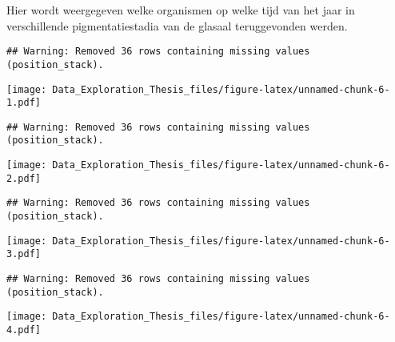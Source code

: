 \documentclass[]{article}
\newenvironment{Shaded}{\begin{snugshade}}{\end{snugshade}}
\newcommand{\KeywordTok}[1]{\textcolor[rgb]{0.13,0.29,0.53}{\textbf{#1}}}
\newcommand{\DataTypeTok}[1]{\textcolor[rgb]{0.13,0.29,0.53}{#1}}
\newcommand{\DecValTok}[1]{\textcolor[rgb]{0.00,0.00,0.81}{#1}}
\newcommand{\StringTok}[1]{\textcolor[rgb]{0.31,0.60,0.02}{#1}}
\newcommand{\ControlFlowTok}[1]{\textcolor[rgb]{0.13,0.29,0.53}{\textbf{#1}}}
\newcommand{\OperatorTok}[1]{\textcolor[rgb]{0.81,0.36,0.00}{\textbf{#1}}}
\newcommand{\NormalTok}[1]{#1}
\begin{document}
Hier wordt weergegeven welke organismen op welke tijd van het jaar in
verschillende pigmentatiestadia van de glasaal teruggevonden werden.

\begin{Shaded}
\end{Shaded}

\begin{verbatim}
## Warning: Removed 36 rows containing missing values (position_stack).
\end{verbatim}

\texttt{[image: Data\_Exploration\_Thesis\_files/figure-latex/unnamed-chunk-6-1.pdf]}

\begin{verbatim}
## Warning: Removed 36 rows containing missing values (position_stack).
\end{verbatim}

\texttt{[image: Data\_Exploration\_Thesis\_files/figure-latex/unnamed-chunk-6-2.pdf]}

\begin{verbatim}
## Warning: Removed 36 rows containing missing values (position_stack).
\end{verbatim}

\texttt{[image: Data\_Exploration\_Thesis\_files/figure-latex/unnamed-chunk-6-3.pdf]}

\begin{verbatim}
## Warning: Removed 36 rows containing missing values (position_stack).
\end{verbatim}

\texttt{[image: Data\_Exploration\_Thesis\_files/figure-latex/unnamed-chunk-6-4.pdf]}
\end{document}
